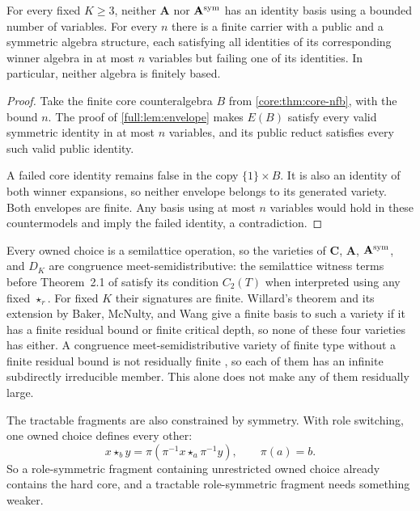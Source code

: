 \begin{theorem}\label{full:thm:nonfinite-basis}
For every fixed $K\geq3$, neither $\mathbf A$ nor
$\mathbf A^{\rm sym}$ has an identity basis using a bounded number of
variables. For every $n$ there is a finite carrier with a public and a
symmetric algebra structure, each satisfying all identities of its
corresponding winner algebra in at most $n$ variables but failing one
of its identities. In particular, neither algebra is finitely based.
\end{theorem}
\begin{proof}
Take the finite core counteralgebra $B$ from
\cref{core:thm:core-nfb}, with the bound $n$. The proof of
\cref{full:lem:envelope} makes $E(B)$ satisfy every valid symmetric
identity in at most $n$ variables, and its public reduct satisfies every
such valid public identity.

A failed core identity remains false in the copy $\{1\}\times B$.
It is also an identity of both winner expansions, so neither envelope
belongs to its generated variety. Both envelopes are finite. Any basis
using at most $n$ variables would hold in these countermodels and imply
the failed identity, a contradiction.
\end{proof}

Every owned choice is a semilattice operation, so the varieties of
$\mathbf C$, $\mathbf A$, $\mathbf A^{\rm sym}$, and $D_K$ are congruence
meet-semidistributive: the semilattice witness terms before Theorem~2.1
of \cite{Willard2000} satisfy its condition $C_2(T)$ when interpreted
using any fixed $\star_r$. For fixed $K$ their signatures are finite.
Willard's theorem \cite{Willard2000} and its extension by Baker,
McNulty, and Wang \cite{BakerMcNultyWang2005} give a finite basis to
such a variety if it has a finite residual bound or finite critical
depth, so none of these four varieties has either. A congruence
meet-semidistributive variety of finite type without a finite residual
bound is not residually finite \cite{KearnesWillard1999}, so each of
them has an infinite subdirectly irreducible member. This alone does
not make any of them residually large.

The tractable fragments are also constrained by symmetry. With role switching, one owned choice defines every other:
\[
 x\star_b y=\pi(\pi^{-1}x\star_a\pi^{-1}y),\qquad\pi(a)=b.
\]
So a role-symmetric fragment containing unrestricted owned choice already contains the hard core, and a tractable role-symmetric fragment needs something weaker.


